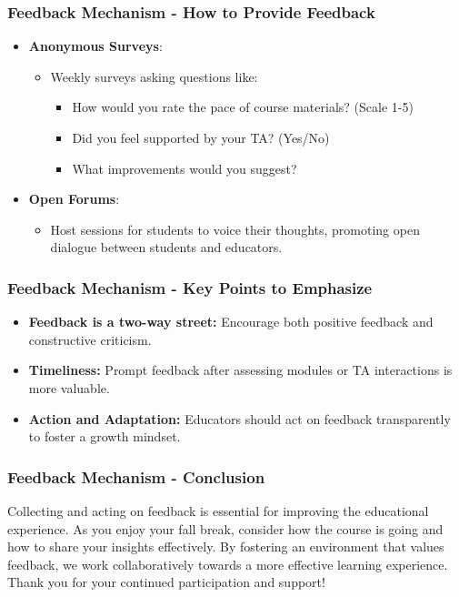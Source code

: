 \documentclass[aspectratio=169]{beamer}
\begin{document}
\begin{frame}[fragile]
    \frametitle{Feedback Mechanism - How to Provide Feedback}
    \begin{itemize}
        \item \textbf{Anonymous Surveys}: 
        \begin{itemize}
            \item Weekly surveys asking questions like:
            \begin{itemize}
                \item How would you rate the pace of course materials? (Scale 1-5)
                \item Did you feel supported by your TA? (Yes/No)
                \item What improvements would you suggest?
            \end{itemize}
        \end{itemize}

        \item \textbf{Open Forums}: 
        \begin{itemize}
            \item Host sessions for students to voice their thoughts, promoting open dialogue between students and educators.
        \end{itemize}
    \end{itemize}
\end{frame}

\begin{frame}[fragile]
    \frametitle{Feedback Mechanism - Key Points to Emphasize}
    \begin{itemize}
        \item \textbf{Feedback is a two-way street:} Encourage both positive feedback and constructive criticism.
        \item \textbf{Timeliness:} Prompt feedback after assessing modules or TA interactions is more valuable.
        \item \textbf{Action and Adaptation:} Educators should act on feedback transparently to foster a growth mindset.
    \end{itemize}
\end{frame}

\begin{frame}[fragile]
    \frametitle{Feedback Mechanism - Conclusion}
    Collecting and acting on feedback is essential for improving the educational experience. 
    As you enjoy your fall break, consider how the course is going and how to share your insights effectively. 
    By fostering an environment that values feedback, we work collaboratively towards a more effective learning experience. Thank you for your continued participation and support!
\end{frame}
\end{document}
